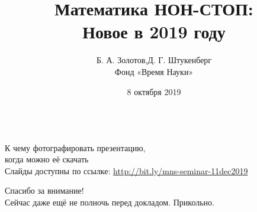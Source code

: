 \documentclass[aspectratio=1610,12pt,notheorems]{beamer}
\title[Mathnonstop 2019: the seminar]
    {\bfseries Математика НОН-СТОП: \\
	Новое в 2019 году}
\author[\ ]
	{Б. А. Золотов,\qquad Д. Г. Штукенберг \\ \vspace{0.3cm}
		{\small Фонд «Время Науки»}}
\institute[\ ]{\ }
\date{8 октября 2019}
\theoremstyle{plain}
\theoremstyle{definition}
\def\ps{\\ [0.65cm]} \linespread{1.16}
\begin{document}
\frame{\titlepage}

\begin{frame} \begin{center}
	{\small\ } \\ [0.7cm]
	{\Large К чему фотографировать презентацию,\smallskip\\ когда можно её скачать} \\ [0.9cm]
	{\small Слайды доступны по ссылке: \url{http://bit.ly/mns-seminar-11dec2019}}
\end{center} \end{frame}







\begin{frame} \begin{center}
	\Huge{Спасибо за внимание!} \ps
	\small{Сейчас даже ещё не полночь перед докладом. Прикольно.}
\end{center} \end{frame}
\end{document}

